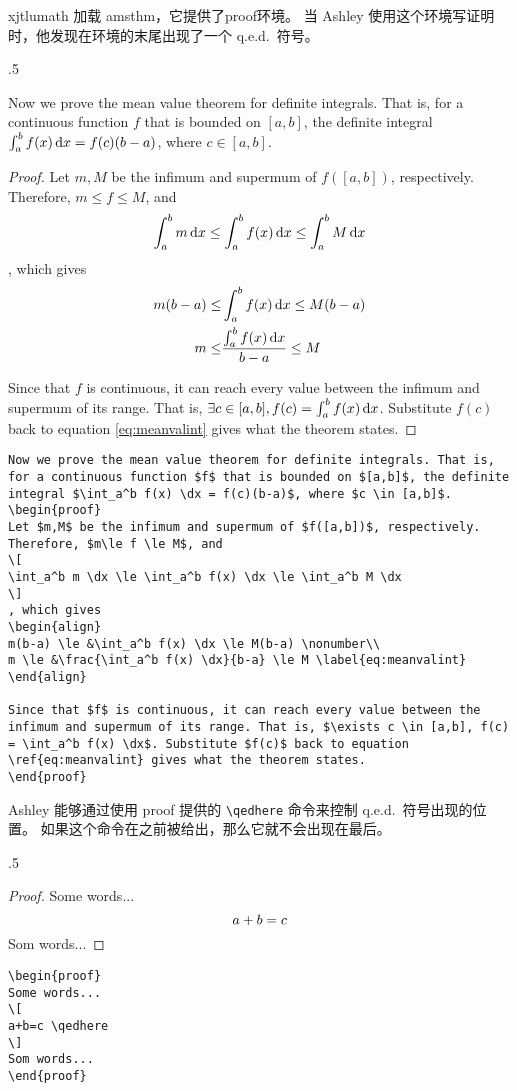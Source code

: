xjtlumath 加载 amsthm，它提供了proof环境。 当 Ashley 使用这个环境写证明时，他发现在环境的末尾出现了一个 q.e.d.~符号。 
\begin{miniexammar}{.5\textandmarginlen}{
Now we prove the mean value theorem for definite integrals. That is, for a continuous function $f$ that is bounded on $[a,b]$, the definite integral $\int_a^b f(x) \,\mathrm{d} x = f(c)(b-a)$, where $c \in [a,b]$. 
\begin{proof}
Let $m,M$ be the infimum and supermum of $f([a,b])$, respectively.
Therefore, $m\le f \le M$, and
\[
\int_a^b m \,\mathrm{d} x \le \int_a^b f(x) \,\mathrm{d} x \le \int_a^b M \,\mathrm{d} x
\]
, which gives
\begin{align}
m(b-a) \le &\int_a^b f(x) \,\mathrm{d} x \le M(b-a) \nonumber\\
m \le &\frac{\int_a^b f(x) \,\mathrm{d} x}{b-a} \le M \label{eq:meanvalint}
\end{align}

Since that $f$ is continuous, it can reach every value between the infimum and supermum of its range. That is, $\exists c \in [a,b], f(c) = \int_a^b f(x) \,\mathrm{d} x$. Substitute $f(c)$ back to equation \ref{eq:meanvalint} gives what the theorem states.
\end{proof}
}
\begin{lstlisting}[basicstyle=\footnotesize]
Now we prove the mean value theorem for definite integrals. That is, for a continuous function $f$ that is bounded on $[a,b]$, the definite integral $\int_a^b f(x) \dx = f(c)(b-a)$, where $c \in [a,b]$. 
\begin{proof}
Let $m,M$ be the infimum and supermum of $f([a,b])$, respectively.
Therefore, $m\le f \le M$, and
\[
\int_a^b m \dx \le \int_a^b f(x) \dx \le \int_a^b M \dx
\]
, which gives
\begin{align}
m(b-a) \le &\int_a^b f(x) \dx \le M(b-a) \nonumber\\
m \le &\frac{\int_a^b f(x) \dx}{b-a} \le M \label{eq:meanvalint}
\end{align}

Since that $f$ is continuous, it can reach every value between the infimum and supermum of its range. That is, $\exists c \in [a,b], f(c) = \int_a^b f(x) \dx$. Substitute $f(c)$ back to equation \ref{eq:meanvalint} gives what the theorem states.
\end{proof}
\end{lstlisting}
\end{miniexammar}

Ashley 能够通过使用 proof 提供的 \verb=\qedhere= 命令来控制 q.e.d.~符号出现的位置。 如果这个命令在之前被给出，那么它就不会出现在最后。
\begin{miniexammar}{.5\textandmarginlen}{
\begin{proof}
Some words...
\[
a+b=c \qedhere
\]
Som words...
\end{proof}
}
\begin{lstlisting}
\begin{proof}
Some words...
\[
a+b=c \qedhere
\]
Som words...
\end{proof}
\end{lstlisting}
\end{miniexammar}

